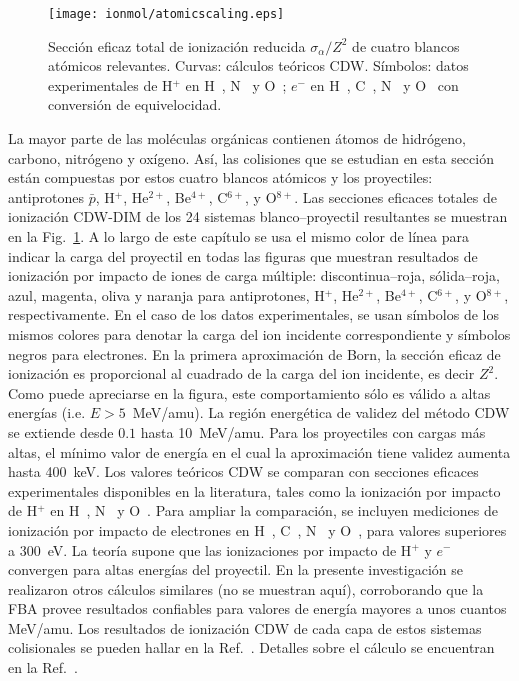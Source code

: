 \begin{figure}
\centering
\texttt{[image: ionmol/atomicscaling.eps]}
\caption[Sección eficaz total de ionización atómica CDW reducida.]
{Sección eficaz total de ionización reducida $\sigma_{\alpha}/Z^2$ 
de cuatro blancos atómicos relevantes. Curvas: cálculos teóricos CDW. 
Símbolos: datos experimentales de H$^+$ en H~\cite{Shah:81}, 
N~\cite{Rudd:85} y O~\cite{Rudd:85}; $e^-$ en 
H~\cite{Shah:87}, C~\cite{Brook:78}, N~\cite{Brook:78} y 
O~\cite{Thompson:95} con conversión de equivelocidad.}
\label{fig:atomscaling}
\end{figure} 

La mayor parte de las moléculas orgánicas contienen átomos de hidrógeno, 
carbono, nitrógeno y oxígeno. Así, las colisiones que se estudian en 
esta sección están compuestas por estos cuatro blancos 
atómicos y los proyectiles: antiprotones $\bar{p}$, H$^{+}$, He$^{2+}$, 
Be$^{4+}$, C$^{6+}$, y O$^{8+}$. Las secciones eficaces totales de 
ionización CDW-DIM de los 24 sistemas blanco--proyectil resultantes se 
muestran en la Fig.~\ref{fig:atomscaling}. 
A lo largo de este capítulo se usa el mismo color de línea para indicar 
la carga del proyectil en todas las figuras que muestran resultados de 
ionización por impacto de iones de carga múltiple: discontinua--roja, 
sólida--roja, azul, magenta, oliva y naranja para antiprotones, H$^{+}$, 
He$^{2+}$, Be$^{4+}$, C$^{6+}$, y O$^{8+}$, respectivamente. En el caso 
de los datos experimentales, se usan símbolos de los mismos colores para 
denotar la carga del ion incidente correspondiente y símbolos negros 
para electrones. En la primera aproximación de Born, la sección eficaz 
de ionización es proporcional al cuadrado de la carga del ion incidente, 
es decir $Z^{2}$. Como puede apreciarse en la figura, este 
comportamiento sólo es válido a altas energías (i.e. $E>5$~MeV/amu). La 
región energética de validez del método CDW se extiende desde $0.1$ 
hasta 10~MeV/amu. Para los proyectiles con cargas más altas, el mínimo 
valor de energía en el cual la aproximación tiene validez aumenta hasta 
400~keV. Los valores teóricos CDW se comparan con secciones eficaces 
experimentales disponibles en la literatura, tales como la ionización 
por impacto de H$^+$ en H~\cite{Shah:81}, N~\cite{Rudd:85} y 
O~\cite{Rudd:85}. Para ampliar la comparación, se incluyen mediciones de 
ionización por impacto de electrones en H~\cite{Shah:87}, 
C~\cite{Brook:78}, N~\cite{Brook:78} y O~\cite{Thompson:95}, para 
valores superiores a 300~eV. La teoría supone que las ionizaciones por 
impacto de H$^+$ y $e^-$ convergen para altas energías del proyectil. 
En la presente investigación se realizaron otros cálculos similares (no 
se muestran aquí), corroborando que la FBA provee resultados confiables 
para valores de energía mayores a unos cuantos MeV/amu. Los resultados 
de ionización CDW de cada capa de estos sistemas colisionales se pueden 
hallar en la Ref.~\cite{Miraglia:19}. Detalles sobre el cálculo se 
encuentran en la Ref.~\cite{Montanari:17-iongasesnobles}.


